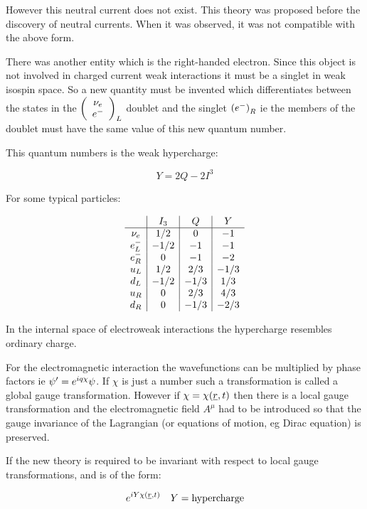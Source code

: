 However this neutral current does not exist.  This theory was proposed before the discovery of neutral currents.  When it was observed, it was not compatible with the above form.

There was another entity which is the right-handed electron.  Since this object is not involved in charged current weak interactions it must be a singlet in weak isospin space.  So a new quantity must be invented which differentiates between the states in the $\left( \begin{array}{cc}\nu_{e}\\e^-\end{array}\right)_L$ doublet and the singlet $\left(e^-\right)_R$ ie the members of the doublet must have the same value of this new quantum number.

This quantum numbers is the weak hypercharge:

\[
  Y = 2Q - 2I^3
\]

For some typical particles:

\[
  \begin{array}{c|c|c|c}
             & I_3  & Q    & Y    \\
    \hline
    \nu_{e} & 1/2  & 0    & -1   \\
    e^-_L   & -1/2 & -1   & -1   \\
    e^-_R   & 0    & -1   & -2   \\
    u_L      & 1/2  & 2/3  & -1/3 \\
    d_L      & -1/2 & -1/3 & 1/3  \\
    u_R      & 0    & 2/3  & 4/3  \\
    d_R      & 0    & -1/3 & -2/3
  \end{array}
\]

In the internal space of electroweak interactions the hypercharge resembles ordinary charge.

For the electromagnetic interaction the wavefunctions can be multiplied by phase factors ie $\psi' = e^{iq\chi}\psi$.  If $\chi$ is just a number such a transformation is called a global gauge transformation.  However if $\chi = \chi(\underline{r},t)$ then there is a local gauge transformation and the electromagnetic field $A^{\mu}$ had to be introduced so that the gauge invariance of the Lagrangian (or equations of motion, eg Dirac equation) is preserved.

If the new theory is required to be invariant with respect to local gauge transformations, and is of the form:

\[
  e^{iY\chi(\underline{r},t)} \quad Y = \textrm{hypercharge}
\]

